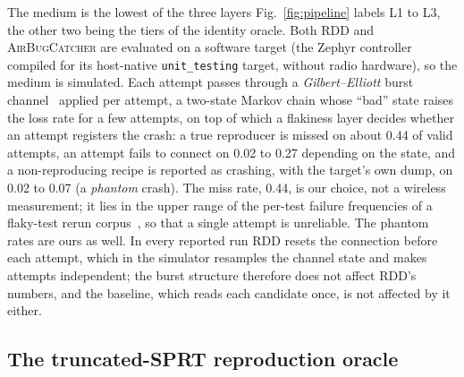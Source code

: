 The medium is the lowest of the three layers Fig.~\ref{fig:pipeline} labels L1 to
L3, the other two being the tiers of the identity oracle. Both RDD and
\textsc{AirBugCatcher} are evaluated on a software target (the Zephyr controller
compiled for its host-native \texttt{unit\_testing} target, without radio
hardware), so the medium is simulated. Each attempt passes through a
\emph{Gilbert--Elliott} burst channel~\cite{gilbert1960,elliott1963} applied per attempt, a two-state
Markov chain whose ``bad'' state raises the loss rate for a few attempts, on top
of which a flakiness layer decides whether an attempt registers the crash: a
true reproducer is missed on about 0.44 of valid attempts, an attempt fails to
connect on 0.02 to 0.27 depending on the state, and a non-reproducing recipe is
reported as crashing, with the target's own dump, on 0.02 to 0.07 (a
\emph{phantom} crash). The miss rate, 0.44, is our choice, not a wireless measurement; it lies in the
upper range of the per-test failure frequencies of a flaky-test rerun
corpus~\cite{flakeflagger2021}, so that a single attempt is unreliable. The
phantom rates are ours as well. In every
reported run RDD resets the connection before each attempt, which in the
simulator resamples the channel state and makes attempts independent; the burst
structure therefore does not affect RDD's numbers, and the baseline, which reads
each candidate once, is not affected by it either.

\subsection{The truncated-SPRT reproduction oracle}

